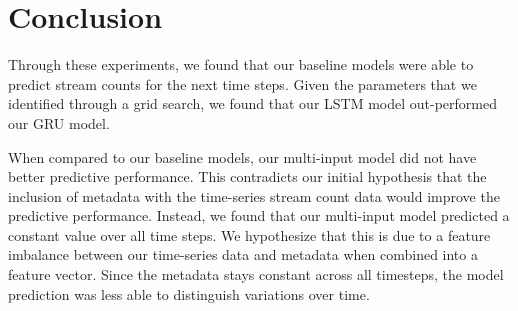 \documentclass[11pt]{article}
\begin{document}
% 
% 



% 
% 
\section{Conclusion}

Through these experiments, we found that our baseline models were able to predict stream counts for the next time steps. Given the parameters that we identified through a grid search, we found that our LSTM model out-performed our GRU model. 

When compared to our baseline models, our multi-input model did not have better predictive performance. This contradicts our initial hypothesis that the inclusion of metadata with the time-series stream count data would improve the predictive performance. Instead, we found that our multi-input model predicted a constant value over all time steps. We hypothesize that this is due to a feature imbalance between our time-series data and metadata when combined into a feature vector. Since the metadata stays constant across all timesteps, the model prediction was less able to distinguish variations over time.
\end{document}
